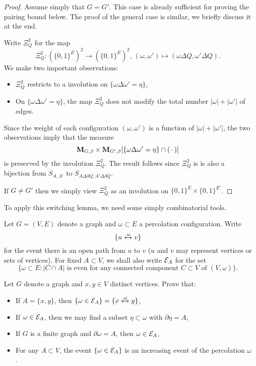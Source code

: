 \begin{proof}
    Assume simply that $G=G'$.
    This case is already sufficient for proving the pairing bound below.
    The proof of the general case is similar,
    we briefly discuss it at the end.

    Write $\Xi_Q^2$ for the map
    \[
        \Xi_Q^2:
        (\{0,1\}^E)^2
        \to
        (\{0,1\}^E)^2
        ,\,(\omega,\omega')\mapsto (\omega\Delta Q,\omega'\Delta Q).
    \]
    We make two important observations:
    \begin{itemize}
        \item $\Xi_Q^2$ restricts to a involution on $\{\omega\Delta\omega'=\eta\}$,
        \item On $\{\omega\Delta\omega'=\eta\}$, the map $\Xi_Q^2$ does not modify the total number $|\omega|+|\omega'|$
        of edges.
    \end{itemize} 
    Since the weight of each configuration $(\omega,\omega')$ is a function of $|\omega|+|\omega'|$,
    the two observations imply that
    the measure \[\mathbf{M}_{G,\beta}\times\mathbf{M}_{G',\beta}
        [\{\omega\Delta\omega'=\eta\}\cap (\,\cdot\,)]\] is preserved by the involution
    $\Xi_Q^2$.
    The result follows since $\Xi_Q^2$ is is also a bijection from $S_{A,A'}$
    to $S_{A\Delta\partial Q,A'\Delta\partial Q}$.

    If $G\neq G'$ then we simply view $\Xi_Q^2$
    as an involution on $\{0,1\}^E\times\{0,1\}^{E'}$.
\end{proof}

To apply this switching lemma,
we need some simply combinatorial tools.

\begin{definition}
    Let $G=(V,E)$ denote a graph and $\omega\subset E$ a percolation configuration.
    Write \[\{u\xleftrightarrow{\omega}v\}\]
    for the event there is an open path from $u$ to $v$
    ($u$ and $v$ may represent vertices or sets of vertices).
    For fixed $A\subset V$, we shall also write $\mathcal E_A$ for the set
    \[
        \{\omega\subset E:\text{$|C\cap A|$ is even for any connected component $C\subset V$ of $(V,\omega)$}\}.
    \]
\end{definition}

\begin{exercise}
    Let $G$ denote a graph and 
    $x,y\in V$  distinct vertices. Prove that:
    \begin{itemize}
        \item If $A=\{x,y\}$, then $\{\omega\in\mathcal E_A\}=\{x\xleftrightarrow{\omega}y\}$,
        \item If $\omega\in\mathcal E_A$, then we may find a subset $\eta\subset\omega$ with $\partial\eta=A$,
        \item If $G$ is a finite graph and $\partial\omega=A$, then $\omega\in\mathcal E_A$,
        \item For any $A\subset V$, the event $\{\omega\in\mathcal E_A\}$ is an increasing event of the percolation $\omega$.
    \end{itemize}
\end{exercise}

